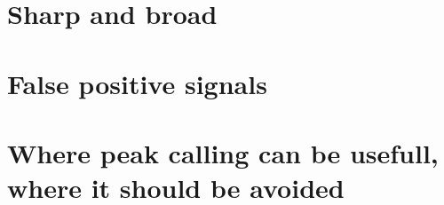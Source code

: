 \section{Sharp and broad}


\section{False positive signals}
\section{Where peak calling can be usefull, where it should be avoided}
